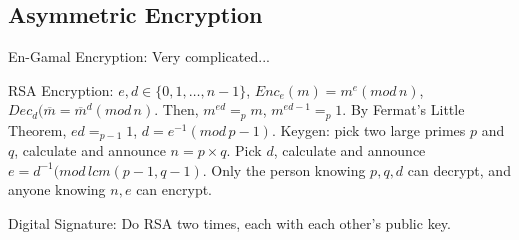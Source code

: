 \documentclass[12pt,a4paper]{ctexrep}
\begin{document}
\subsection{Asymmetric Encryption}
En-Gamal Encryption: Very complicated...%

RSA Encryption:
$e,d \in \{0,1,\dots,n-1\}$, $Enc_e(m) = m^e (mod\, n)$, $Dec_d(\overline{m} = \overline{m}^d (mod\, n)$. Then, $m^{ed} =_p m$, $m^{ed-1} =_p 1$. By Fermat's Little Theorem, $ed =_{p-1} 1$, $d = e^{-1} (mod\, p-1)$. Keygen: pick two large primes $p$ and $q$, calculate and announce $n = p \times q$. Pick $d$, calculate and announce $e = d^{-1} (mod\, lcm(p-1,q-1)$. Only the person knowing $p,q,d$ can decrypt, and anyone knowing $n,e$ can encrypt.

Digital Signature:
Do RSA two times, each with each other's public key.

\ifdebug
\end{document}
